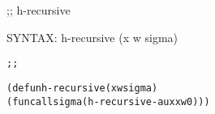 \begin{aibox}{\function}
;; h-recursive

SYNTAX: h-recursive (x w sigma) 
\end{aibox}

\begin{aibox}{\examples}
\begin{alltt}
\end{alltt}

\end{aibox}

\begin{aibox}{\comments}

\end{aibox}
\begin{aibox}{\answers}

\end{aibox}
\begin{aibox}{\othercomments}

\end{aibox}
\begin{aibox}{\pseudocode}

\end{aibox}
\begin{aibox}{\code}

\begin{alltt}
;;%% code

(defun h-recursive (x w sigma) 
        (funcall sigma (h-recursive-aux x w 0)))

\end{alltt}
\end{aibox}
